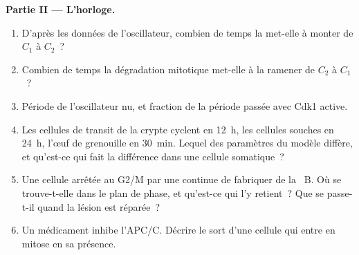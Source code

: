 \begin{problem}
\medskip
\noindent\textbf{Partie II --- L'horloge.}
\begin{enumerate}[resume]
  \item D'après les données de l'oscillateur, combien de temps la
         met-elle à monter de $C_{1}$ à $C_{2}$~?
  \item Combien de temps la dégradation mitotique met-elle à la
        ramener de $C_{2}$ à $C_{1}$~?
  \item Période de l'oscillateur nu, et fraction de la période passée
        avec Cdk1 active.
  \item Les cellules de transit de la crypte cyclent en \qty{12}{h},
        les cellules souches en \qty{24}{h}, l'œuf de grenouille en
        \qty{30}{min}. Lequel des paramètres du modèle diffère, et
        qu'est-ce qui fait la différence dans une cellule somatique~?
  \item Une cellule arrêtée au  G2/M par une  continue de fabriquer de la ~B. Où se trouve-t-elle
        dans le plan de phase, et qu'est-ce qui l'y retient~? Que se
        passe-t-il quand la lésion est réparée~?
  \item Un médicament inhibe l'APC/C. Décrire le sort d'une cellule qui
        entre en mitose en sa présence.
\end{enumerate}


\end{problem}

